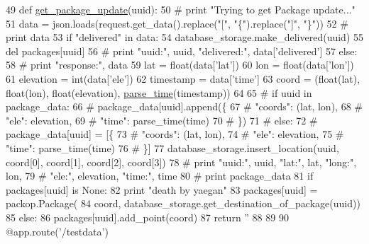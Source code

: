 \begin{DoxyCode}
49 \textcolor{keyword}{def }\hyperlink{namespacerun_a432d624c0f4e135377bbf7d16186bf04}{get\_package\_update}(uuid):
50     \textcolor{comment}{# print "Trying to get Package update..."}
51     data = json.loads(request.get\_data().replace(\textcolor{stringliteral}{"["}, \textcolor{stringliteral}{"\{"}).replace(\textcolor{stringliteral}{"]"}, \textcolor{stringliteral}{"\}"}))
52     \textcolor{comment}{# print data}
53     \textcolor{keywordflow}{if} \textcolor{stringliteral}{"delivered"} \textcolor{keywordflow}{in} data:
54         database\_storage.make\_delivered(uuid)
55         del packages[uuid]
56         \textcolor{comment}{# print "uuid:", uuid, "delivered:", data['delivered']}
57     \textcolor{keywordflow}{else}:
58         \textcolor{comment}{# print "response:", data}
59         lat = float(data[\textcolor{stringliteral}{'lat'}])
60         lon = float(data[\textcolor{stringliteral}{'lon'}])
61         elevation = int(data[\textcolor{stringliteral}{'ele'}])
62         timestamp = data[\textcolor{stringliteral}{'time'}]
63         coord = (float(lat), float(lon), float(elevation), \hyperlink{namespacerun_a24e731324376cce7c7e80c7a50186b67}{parse\_time}(timestamp))
64 
65         \textcolor{comment}{# if uuid in package\_data:}
66         \textcolor{comment}{#     package\_data[uuid].append(\{}
67         \textcolor{comment}{#         "coords": (lat, lon),}
68         \textcolor{comment}{#         "ele": elevation,}
69         \textcolor{comment}{#         "time": parse\_time(time)}
70         \textcolor{comment}{#         \})}
71         \textcolor{comment}{# else:}
72         \textcolor{comment}{#     package\_data[uuid] = [\{}
73         \textcolor{comment}{#         "coords": (lat, lon),}
74         \textcolor{comment}{#         "ele": elevation,}
75         \textcolor{comment}{#         "time": parse\_time(time)}
76         \textcolor{comment}{#         \}]}
77         database\_storage.insert\_location(uuid, coord[0], coord[1], coord[2], coord[3])
78         \textcolor{comment}{# print "uuid:", uuid, "lat:", lat, "long:", lon,}
79         \textcolor{comment}{#                "ele:", elevation, "time:", time}
80         \textcolor{comment}{# print package\_data}
81         \textcolor{keywordflow}{if} packages[uuid] \textcolor{keywordflow}{is} \textcolor{keywordtype}{None}:
82             \textcolor{keywordflow}{print} \textcolor{stringliteral}{"death by yaegan"}
83             packages[uuid] = packop.Package(
84                 coord, database\_storage.get\_destination\_of\_package(uuid))
85         \textcolor{keywordflow}{else}:
86             packages[uuid].add\_point(coord)
87     \textcolor{keywordflow}{return} \textcolor{stringliteral}{''}
88 
89 
90 @app.route(\textcolor{stringliteral}{'/testdata'})
\end{DoxyCode}
